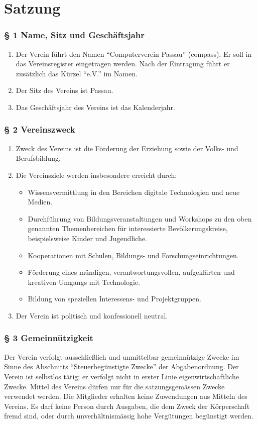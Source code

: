 \documentclass[a4paper,10pt]{article}
\begin{document}
\section{Satzung}

\subsubsection*{§ 1 Name, Sitz und Geschäftsjahr}
\begin{enumerate}
   \item Der Verein führt den Namen ``Computerverein Passau'' (compass). Er soll
     in das Vereinsregister eingetragen werden. Nach der Eintragung führt er
     zusätzlich das Kürzel ``e.V.'' im Namen.
   \item Der Sitz des Vereins ist Passau.
   \item Das Geschäftsjahr des Vereins ist das Kalenderjahr.
\end{enumerate}

\subsubsection*{§ 2 Vereinszweck }
\begin{enumerate}
  \item Zweck des Vereins ist die Förderung der Erziehung sowie der Volks- und Berufsbildung.
  \item Die Vereinsziele werden insbesondere erreicht durch:
    \begin{itemize}
      \item Wissensvermittlung in den Bereichen digitale Technologien und neue Medien.
      \item Durchführung von Bildungsveranstaltungen und Workshops zu den oben
        genannten Themenbereichen für interessierte Bevölkerungskreise,
        beispielsweise Kinder und Jugendliche.
      \item Kooperationen mit Schulen, Bildungs- und Forschungseinrichtungen.
      \item Förderung eines mündigen, verantwortungsvollen, aufgeklärten und
        kreativen Umgangs mit Technologie.
      \item Bildung von speziellen Interessens- und Projektgruppen.
    \end{itemize}
  \item Der Verein ist politisch und konfessionell neutral.
\end{enumerate}

\subsubsection*{§ 3 Gemeinnützigkeit}
Der Verein verfolgt ausschließlich und unmittelbar gemeinnützige Zwecke im Sinne
des Abschnitts ``Steuerbegünstigte Zwecke'' der Abgabenordnung. Der Verein ist
selbstlos tätig; er verfolgt nicht in erster Linie eigenwirtschaftliche Zwecke.
Mittel des Vereins dürfen nur für die satzungsgemässen Zwecke verwendet werden.
Die Mitglieder erhalten keine Zuwendungen aus Mitteln des Vereins. Es darf keine
Person durch Ausgaben, die dem Zweck der Körperschaft fremd sind, oder durch
unverhältnismässig hohe Vergütungen begünstigt werden.
\end{document}
